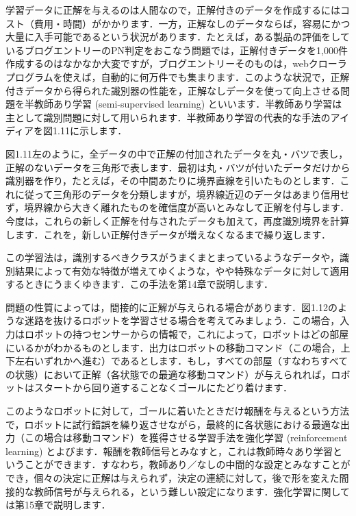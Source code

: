 学習データに正解を与えるのは人間なので，正解付きのデータを作成するにはコスト（費用・時間）がかかります．一方，正解なしのデータならば，容易にかつ大量に入手可能であるという状況があります．たとえば，ある製品の評価をしているブログエントリーのPN判定をおこなう問題では，正解付きデータを1,000件作成するのはなかなか大変ですが，ブログエントリーそのものは，webクローラプログラムを使えば，自動的に何万件でも集まります．このような状況で，正解付きデータから得られた識別器の性能を，正解なしデータを使って向上させる問題を半教師あり学習 (semi-supervised learning) といいます．半教師あり学習は主として識別問題に対して用いられます．半教師あり学習の代表的な手法のアイディアを図1.11に示します．

図1.11左のように，全データの中で正解の付加されたデータを丸・バツで表し，正解のないデータを三角形で表します．最初は丸・バツが付いたデータだけから識別器を作り，たとえば，その中間あたりに境界直線を引いたものとします．これに従って三角形のデータを分類しますが，境界線近辺のデータはあまり信用せず，境界線から大きく離れたものを確信度が高いとみなして正解を付与します．今度は，これらの新しく正解を付与されたデータも加えて，再度識別境界を計算します．これを，新しい正解付きデータが増えなくなるまで繰り返します．

この学習法は，識別するべきクラスがうまくまとまっているようなデータや，識別結果によって有効な特徴が増えてゆくような，やや特殊なデータに対して適用するときにうまくゆきます．この手法を第14章で説明します．


問題の性質によっては，間接的に正解が与えられる場合があります．図1.12のような迷路を抜けるロボットを学習させる場合を考えてみましょう．この場合，入力はロボットの持つセンサーからの情報で，これによって，ロボットはどの部屋にいるかがわかるものとします．出力はロボットの移動コマンド（この場合，上下左右いずれかへ進む）であるとします．もし，すべての部屋（すなわちすべての状態）において正解（各状態での最適な移動コマンド）が与えられれば，ロボットはスタートから回り道することなくゴールにたどり着けます．

このようなロボットに対して，ゴールに着いたときだけ報酬を与えるという方法で，ロボットに試行錯誤を繰り返させながら，最終的に各状態における最適な出力（この場合は移動コマンド）を獲得させる学習手法を強化学習 (reinforcement learning) とよびます．報酬を教師信号とみなすと，これは教師時々あり学習ということができます．すなわち，教師あり／なしの中間的な設定とみなすことができ，個々の決定に正解は与えられず，決定の連続に対して，後で形を変えた間接的な教師信号が与えられる，という難しい設定になります．強化学習に関しては第15章で説明します．

